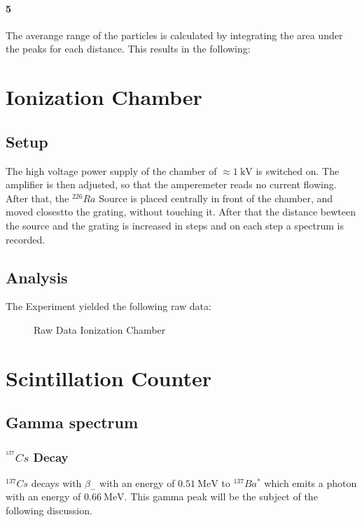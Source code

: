 \documentclass[12pt,twoside,a4paper]{scrartcl}
\begin{document}
			\paragraph{5}
				The averange range of the particles is calculated by integrating the area under the peaks for each distance.
				This results in the following:

\section{Ionization Chamber}

	\subsection{Setup}
		 The high voltage power supply of the chamber of $\approx \SI{1}{\kilo \volt}$ is switched on. The amplifier is then adjusted, so that the amperemeter reads no current flowing. After that, the $^{226}Ra$ Source is placed centrally in front of the chamber, and moved closestto the grating, without touching it. After that the distance bewteen the source and the grating is increased in steps and on each step a spectrum is recorded.

	\subsection{Analysis}

		The Experiment yielded the following raw data:

		\begin{figure}[H]
			\caption{Raw Data Ionization Chamber}
		\end{figure}


\section{Scintillation Counter}
	\subsection{Gamma spectrum}
	\label{Gamma}
        \subsubsection{$^{^137}Cs$ Decay}
        $^{137} Cs$ decays with $\beta_-$ with an energy of $\SI{0.51}{\mega\electronvolt}$ to
        $^{137}Ba^*$ which emits a photon with an energy of $\SI{0.66}{\mega\electronvolt}$.
        This gamma peak will be the subject of the following discussion.
\end{document}
